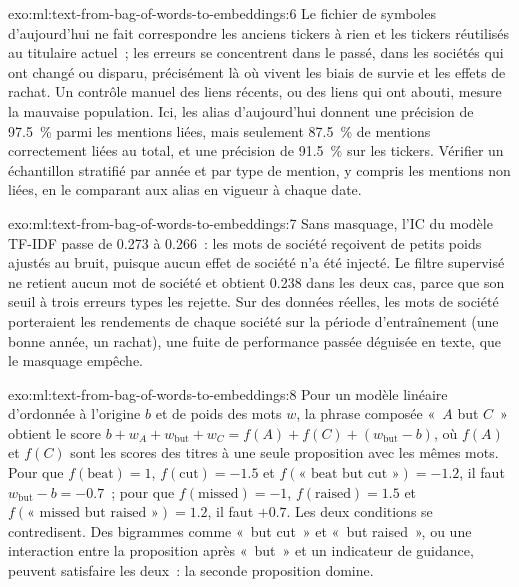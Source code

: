 \begin{solution}{exo:ml:text-from-bag-of-words-to-embeddings:6}
Le fichier de symboles d'aujourd'hui ne fait correspondre les anciens tickers à rien et les tickers réutilisés au titulaire actuel~; les erreurs se concentrent dans le passé,
dans les sociétés qui ont changé ou disparu, précisément là où vivent les biais de survie et les effets de rachat. Un contrôle manuel
des liens récents, ou des liens qui ont abouti, mesure la mauvaise population. Ici, les alias d'aujourd'hui donnent une précision de 97.5~\% parmi
les mentions liées, mais seulement 87.5~\% de mentions correctement liées au total, et une précision de 91.5~\% sur les tickers. Vérifier un échantillon stratifié par année et par
type de mention, y compris les mentions non liées, en le comparant aux alias en vigueur à chaque date.
\end{solution}

\begin{solution}{exo:ml:text-from-bag-of-words-to-embeddings:7}
Sans masquage, l'IC du modèle TF-IDF passe de 0.273 à 0.266~: les mots de société reçoivent de petits poids ajustés au bruit, puisque aucun
effet de société n'a été injecté. Le filtre supervisé ne retient aucun mot de société et obtient 0.238 dans les deux cas, parce que son
seuil à trois erreurs types les rejette. Sur des données réelles, les mots de société porteraient les rendements de chaque société sur la période d'entraînement
(une bonne année, un rachat), une fuite de performance passée déguisée en texte, que le masquage empêche.
\end{solution}

\begin{solution}{exo:ml:text-from-bag-of-words-to-embeddings:8}
Pour un modèle linéaire d'ordonnée à l'origine $b$ et de poids des mots $w$, la phrase composée «~$A$ but $C$~» obtient le score $b + w_A + w_{\text{but}} + w_C
= f(A) + f(C) + (w_{\text{but}} - b)$, où $f(A)$ et $f(C)$ sont les scores des titres à une seule proposition avec les mêmes
mots. Pour que $f(\text{beat}) = 1$, $f(\text{cut}) = -1.5$ et $f(\text{«~beat but cut~»}) = -1.2$, il faut $w_{\text{but}} - b =
-0.7$~; pour que $f(\text{missed}) = -1$, $f(\text{raised}) = 1.5$ et $f(\text{«~missed but raised~»}) = 1.2$, il faut $+0.7$. Les
deux conditions se contredisent. Des bigrammes comme «~but cut~» et «~but raised~», ou une interaction entre la proposition
après «~but~» et un indicateur de guidance, peuvent satisfaire les deux~: la seconde proposition domine.
\end{solution}

